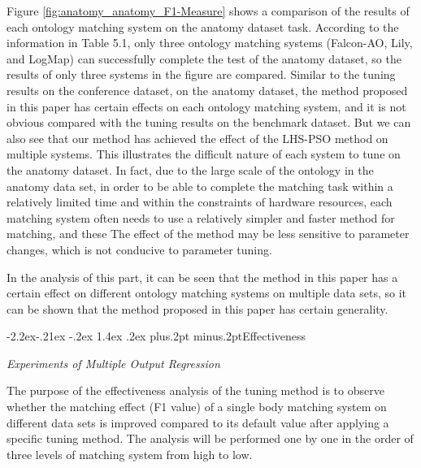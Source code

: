\documentclass[twoside]{article}
\makeatletter
\def\subsection{\@startsection{subsection}{2}{\z@}%
 {-3ex\@plus -.2ex \@minus -.2ex}%
 {2ex \@plus.2ex}%
{\normalfont\normalsize\protect\baselineskip=12.5pt plus.2pt minus.2pt\bfseries}}
\def\subsubsection{\@startsection{subsubsection}{3}{\z@}%
 {-2.2ex\@plus -.21ex \@minus -.2ex}%
 {1.4ex \@plus.2ex}
{\normalfont\normalsize\protect\baselineskip=12pt plus.2pt minus.2pt\sl}}
\makeatother
\begin{document}
Figure \ref{fig:anatomy_anatomy_F1-Measure} shows a comparison of the results of each ontology matching system on the anatomy dataset task.
According to the information in Table 5.1, only three ontology matching systems (Falcon-AO, Lily, and LogMap) can successfully complete the test of the anatomy dataset, so the results of only three systems in the figure are compared.
Similar to the tuning results on the conference dataset, on the anatomy dataset, the method proposed in this paper has certain effects on each ontology matching system, and it is not obvious compared with the tuning results on the benchmark dataset.
But we can also see that our method has achieved the effect of the LHS-PSO method on multiple systems.
This illustrates the difficult nature of each system to tune on the anatomy dataset.
In fact, due to the large scale of the ontology in the anatomy data set, in order to be able to complete the matching task within a relatively limited time and within the constraints of hardware resources, each matching system often needs to use a relatively simpler and faster method for matching, and these The effect of the method may be less sensitive to parameter changes, which is not conducive to parameter tuning.

In the analysis of this part, it can be seen that the method in this paper has a certain effect on different ontology matching systems on multiple data sets, so it can be shown that the method proposed in this paper has certain generality.


\subsubsection{Effectiveness}

{\it Experiments of Multiple Output Regression}

The purpose of the effectiveness analysis of the tuning method is to observe whether the matching effect (F1 value) of a single body matching system on different data sets is improved compared to its default value after applying a specific tuning method.
The analysis will be performed one by one in the order of three levels of matching system from high to low.
\end{document}
